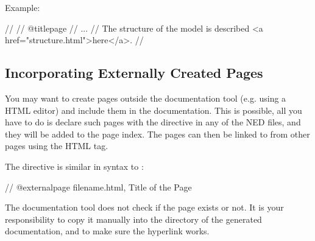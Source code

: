 Example:
\begin{ned}
//
// @titlepage
// ...
// The structure of the model is described <a href="structure.html">here</a>.
//
\end{ned}


\subsection{Incorporating Externally Created Pages}

You may want to create pages outside the documentation tool
(e.g. using a HTML editor) and include them in the documentation.
This is possible, all you have to do is declare such pages with
the  directive in any of the NED files, and
they will be added to the page index. The pages can then be linked to
from other pages using the HTML  tag.

The  directive is similar in syntax to :

\begin{ned}
// @externalpage filename.html, Title of the Page
\end{ned}

The documentation tool does not check if the page exists
or not. It is your responsibility to copy it manually into
the directory of the generated documentation, and to make
sure the hyperlink works.


